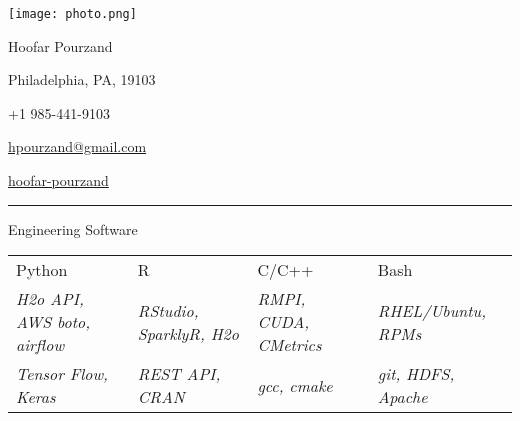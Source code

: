 \documentclass[a4paper,10pt]{article}
\newlength{\cvcolumngapwidth}
\newlength{\cvleftcolumnwidth}
\newlength{\cvrightcolumnwidth}
\newcommand{\cvnamestyle}[1]{{\Large\cvnamefont\textcolor{cvnamecolor}{#1}}}
\newcommand{\cvsectionstyle}[1]{{\normalsize\cvsectionfont\textcolor{cvsectioncolor}{#1}}}
\newcommand{\cvheadingstyle}[1]{{\normalsize\cvheadingfont\textcolor{cvheadingcolor}{#1}}}
\newlength{\cvafteritemskipamount}
\newlength{\cvaftersectionskipamount}
\newlength{\cvbetweensectionandheadingextraskipamount}
\newlength{\cvafternameskipamount}
\newlength{\cvafterpersonalinfolineskipamount}
\newlength{\cvparskip}
\newcommand{\cvpersonalinfo}[2]{
    \begin{minipage}[t]{\cvleftcolumnwidth}
        \vspace{0mm} %
        \raggedleft #1
    \end{minipage}%
    \hspace{\cvcolumngapwidth}%
    \begin{minipage}[t]{\cvrightcolumnwidth}
        \vspace{0mm} %
        #2
    \end{minipage}

    \vspace{\cvafteritemskipamount}
}
\newcommand{\cvname}[1]{
    \cvnamestyle{#1}

    \vspace{\cvafternameskipamount}
}
\newcommand{\cvpersonalinfolinewithicon}[3]{
    \raisebox{.5\fontcharht\font`E-.5\height}{\texttt{[image: \#2]}}
    #3

    \vspace{\cvafterpersonalinfolineskipamount}
}
\newcommand{\cvsection}[1]{
    \begin{minipage}[t]{\cvleftcolumnwidth}
        \raggedleft\cvsectionstyle{#1}
    \end{minipage}%
    \hspace{\cvcolumngapwidth}%
    \begin{minipage}[t]{\cvrightcolumnwidth}
        \textcolor{cvrulecolor}{\rule{\cvrightcolumnwidth}{0.3mm}}
    \end{minipage}

    \vspace{\cvaftersectionskipamount}
}
\newcommand{\cvitem}[2]{
    \begin{minipage}[t]{\cvleftcolumnwidth}
        \raggedleft #1
    \end{minipage}%
    \hspace{\cvcolumngapwidth}%
    \begin{minipage}[t]{\cvrightcolumnwidth}
        \setlength{\parskip}{\cvparskip} #2
    \end{minipage}

    \vspace{\cvafteritemskipamount}
}
\begin{document}

\cvpersonalinfo{
    \texttt{[image: photo.png]}
    }{
    \cvname{Hoofar Pourzand}

    \cvpersonalinfolinewithicon{height=4mm}{072-location.pdf}{
        Philadelphia, PA, 19103 
    }

    \cvpersonalinfolinewithicon{height=4mm}{067-phone.pdf}{
        +1 985-441-9103
    }

    \cvpersonalinfolinewithicon{height=4mm}{070-envelop.pdf}{
        \href{mailto:hpourzand@gmail.com}{hpourzand@gmail.com}
    }

    \cvpersonalinfolinewithicon{height=4mm}{458-linkedin.pdf}{
        \href{https://www.linkedin.com/in/hoofar-pourzand/}{hoofar-pourzand}
    }
 
    
   
    
}


\cvsection{\textbf{SKILLS}}

\vspace{\cvbetweensectionandheadingextraskipamount}


\cvitem{
    \cvheadingstyle{Engineering Software}
    
}{  
        \setlength\tabcolsep{5pt}
        \begin{tabular}{|l|l|l|l|}

        Python   & R   & C/C++  & Bash \\
        \footnotesize{\emph{H2o API, AWS boto, airﬂow }} &
        \footnotesize{\emph{RStudio, SparklyR, H2o}} &
        \footnotesize{\emph{RMPI, CUDA, CMetrics }} &
        \footnotesize{\emph{RHEL/Ubuntu, RPMs}}\\
        
        \footnotesize{\emph{Tensor Flow, Keras}} &
         \footnotesize{\emph{REST API, CRAN}} &
         \footnotesize{\emph{gcc, cmake}} &
         \footnotesize{\emph{git, HDFS, Apache }}\\
         
         
        \end{tabular}
}
\end{document}
